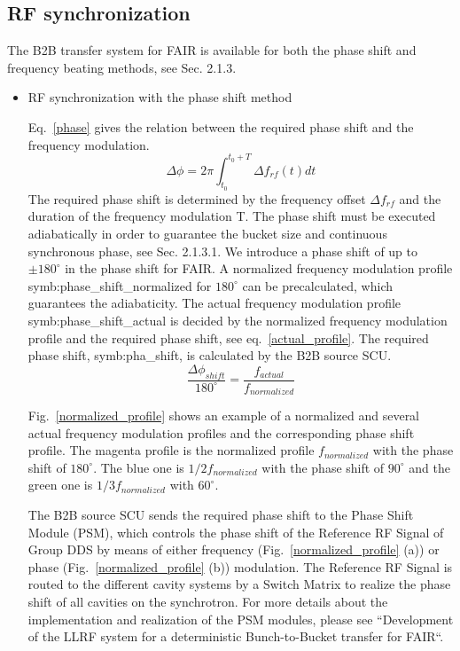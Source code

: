 \subsection{RF synchronization}
The B2B transfer system for FAIR is available for both the phase shift and frequency beating methods, see Sec. 2.1.3.
\begin{itemize}
\item RF synchronization with the phase shift method

Eq.~\ref{phase} gives the relation between the required phase shift and the frequency modulation. 
\begin{equation}
\Delta \phi= 2\pi \int_{t_0}^{t_0+T} \Delta f_{rf}(t)dt \label{phase}
\end{equation}
The required phase shift is determined by the frequency offset $\Delta f_{rf}$ and the duration of the frequency modulation T. The phase shift must be executed adiabatically in order to guarantee the bucket size and continuous synchronous phase, see Sec. 2.1.3.1. We introduce a phase shift of up to $\pm 180^\circ$ in the phase shift for FAIR. A normalized frequency modulation profile \gls{symb:phase_shift_normalized} for $180^\circ$ can be precalculated, which guarantees the adiabaticity. The actual frequency modulation profile \gls{symb:phase_shift_actual} is decided by the normalized frequency modulation profile and the required phase shift, see eq.~\ref{actual_profile}. The required phase shift, \gls{symb:pha_shift}, is calculated by the B2B source SCU.
\begin{equation}
\frac{\Delta \phi_{shift}}{180^\circ}= \frac{f_{actual}}{f_{normalized}} \label{actual_profile}
\end{equation}

Fig.~\ref{normalized_profile} shows an example of a normalized and several actual frequency  modulation profiles and the corresponding phase shift profile. The magenta profile is the normalized profile $f_{normalized}$ with the phase shift of $180^\circ$. The blue one is $1/2f_{normalized}$ with the phase shift of $90^\circ$ and the green one is $1/3f_{normalized}$ with $60^\circ$. 

The B2B source SCU sends the required phase shift to the Phase Shift Module (\gls{PSM}), which controls the phase shift of the Reference RF Signal of Group DDS by means of either frequency (Fig.~\ref{normalized_profile} (a)) or phase (Fig.~\ref{normalized_profile} (b)) modulation. The Reference RF Signal is routed to the different cavity systems by a Switch Matrix to realize the phase shift of all cavities on the synchrotron. For more details about the implementation and realization of the PSM modules, please see ``Development of the LLRF system for a deterministic Bunch-to-Bucket transfer for FAIR``.
                       

\end{itemize}
